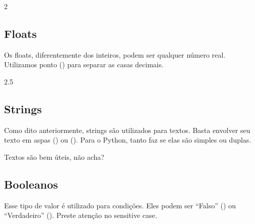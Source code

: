 \documentclass[letterpaper,10pt,english]{jupyterBook}
\begin{document}
\begin{sphinxVerbatim}[commandchars=\\\{\}]
2
\end{sphinxVerbatim}


\subsection{Floats}
\label{\detokenize{chapters/2:floats}}
\sphinxAtStartPar
Os floats, diferentemente dos inteiros, podem ser qualquer número real. Utilizamos ponto () para separar as casas decimais.

\begin{sphinxVerbatim}[commandchars=\\\{\}]
  
\end{sphinxVerbatim}

\begin{sphinxVerbatim}[commandchars=\\\{\}]
2.5
\end{sphinxVerbatim}


\subsection{Strings}
\label{\detokenize{chapters/2:strings}}
\sphinxAtStartPar
Como dito anteriormente, strings são utilizados para textos. Basta envolver seu texto em aspas () ou (). Para o Python, tanto faz se elas são simples ou duplas.

\begin{sphinxVerbatim}[commandchars=\\\{\}]
  
\end{sphinxVerbatim}

\begin{sphinxVerbatim}[commandchars=\\\{\}]
\PYGZsq{}Textos são bem úteis, não acha?\PYGZsq{}
\end{sphinxVerbatim}


\subsection{Booleanos}
\label{\detokenize{chapters/2:booleanos}}
\sphinxAtStartPar
Esse tipo de valor é utilizado para condições. Eles podem ser “Falso” () ou “Verdadeiro” (). Preste atenção no sensitive case.
\end{document}
